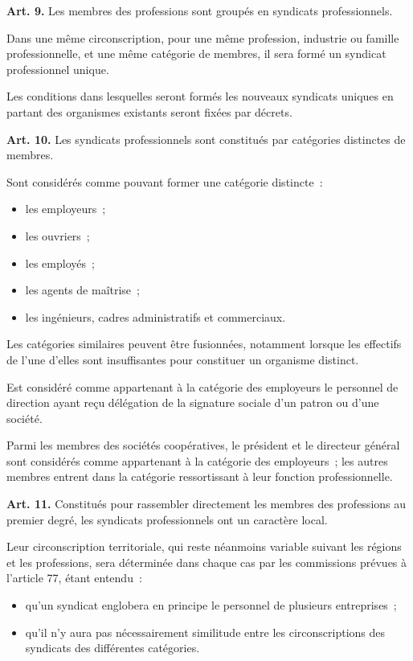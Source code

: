 \documentclass[french,twoside]{book} %
\newcommand{\labelchar}[1]{\textbf{\color{rubric} #1}}
\begin{document}
\labelchar{Art. 9.} Les membres des professions sont groupés en syndicats professionnels.\par
Dans une même circonscription, pour une même profession, industrie ou famille professionnelle, et une même catégorie de membres, il sera formé un syndicat professionnel unique.\par
Les conditions dans lesquelles seront formés les nouveaux syndicats uniques en partant des organismes existants seront fixées par décrets.\par
\bigbreak
\noindent \labelchar{Art. 10.} Les syndicats professionnels sont constitués par catégories distinctes de membres.\par
Sont considérés comme pouvant former une catégorie distincte :\par

\begin{itemize}[itemsep=0pt,]
\item les employeurs ;
\item les ouvriers ;
\item les employés ;
\item les agents de maîtrise ;
\item les ingénieurs, cadres administratifs et commerciaux.
\end{itemize}

\noindent Les catégories similaires peuvent être fusionnées, notamment lorsque les effectifs de l’une d’elles sont insuffisantes pour constituer un organisme distinct.\par
Est considéré comme appartenant à la catégorie des employeurs le personnel de direction ayant reçu délégation de la signature sociale d’un patron ou d’une société.\par
Parmi les membres des sociétés coopératives, le président et le directeur général sont considérés comme appartenant à la catégorie des employeurs ; les autres membres entrent dans la catégorie ressortissant à leur fonction professionnelle.\par
\bigbreak
\noindent \labelchar{Art. 11.} Constitués pour rassembler directement les membres des professions au premier degré, les syndicats professionnels ont un caractère local.\par
Leur circonscription territoriale, qui reste néanmoins variable suivant les régions et les professions, sera déterminée dans chaque cas par les commissions prévues à l’article 77, étant entendu :\par

\begin{itemize}[itemsep=0pt,]
\item qu’un syndicat englobera en principe le personnel de plusieurs entreprises ;
\item qu’il n’y aura pas nécessairement similitude entre les circonscriptions des syndicats des différentes catégories.
\end{itemize}
\end{document}
